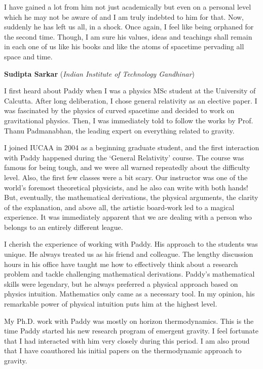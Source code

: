 \documentclass[prd, preprint, longbibliography, 12pt]{revtex4-2}
\begin{document}
I have gained a lot from him not just academically but even on a personal level which he may not be aware of and I am truly indebted to him for that. Now, suddenly he has left us all, in a shock. Once again, I feel like being orphaned for the second time. Though, I am sure his values, ideas and teachings shall remain in each one of us like his books and like the atoms of spacetime pervading all space and time. 

\bigskip

\bigskip


\centerline{{\bf Sudipta Sarkar} ({\it Indian Institute of Technology Gandhinar})}
\medskip
{}

I first heard about Paddy when I was a physics MSc student at the University of Calcutta. After long deliberation, I chose general relativity as an elective paper. I was fascinated by the physics of curved spacetime and decided to work on gravitational physics. Then, I was immediately told to follow the works by Prof. Thanu Padmanabhan, the leading expert on everything related to gravity.

I joined IUCAA in 2004 as a beginning graduate student, and the first interaction with Paddy happened during the `General Relativity' course. The course was famous for being tough, and we were all warned repeatedly about the difficulty level. Also, the first few classes were a bit scary. Our instructor was one of the world's foremost theoretical physicists, and he also can write with both hands! But, eventually, the mathematical derivations, the physical arguments, the clarity of the explanation, and above all, the artistic board-work led to a magical experience. It was immediately apparent that we are dealing with a person who belongs to an entirely different league. 

I cherish the experience of working with Paddy. His approach to the students was unique. He always treated us as his friend and colleague. The lengthy discussion hours in his office have taught me how to effectively think about a research problem and tackle challenging mathematical derivations. Paddy's mathematical skills were legendary, but he always preferred a physical approach based on physics intuition. Mathematics only came as a necessary tool.  In my opinion, his remarkable power of physical intuition puts him at the highest level.

My Ph.D. work with Paddy was mostly on horizon thermodynamics. This is the time Paddy started his new research program of emergent gravity.  I feel fortunate that I had interacted with him very closely during this period.  I am also proud that I have coauthored his initial papers on the thermodynamic approach to gravity.
\end{document}
